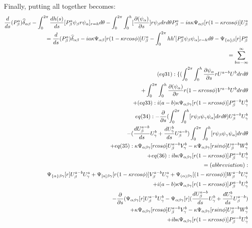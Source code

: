\documentclass{Note}
\begin{document}
Finally,  putting all together becomes:
\begin{equation}
\begin{aligned}
{d \over {d s}} (P_\beta^a )\widehat{\delta }_{\alpha\beta}-\int_0^{2\pi}{dh(s)\over ds}[P_\beta^a \psi_\beta r\psi_\alpha ]_{r=h}d\theta-\int_0^{2\pi} \int_0^h [{\partial (\psi_\alpha) \over {\partial s}}] r  \psi_\beta dr d\theta P_\beta^a-ia\kappa \Psi_{\alpha\beta}[r(1-\kappa rcos\phi)]U_\beta^a\\
={d \over {d s}} (P_\beta^a )\widehat{\delta }_{\alpha\beta}-ia\kappa \Psi_{\alpha\beta}[r(1-\kappa rcos\phi)]U_\beta^a
-\int_0^{2\pi} hh'[P_\beta^a \psi_\beta \psi_\alpha ]_{r=h}d\theta-\Psi_{\{\alpha\}\beta}[r] P_\beta^a\\
=
\sum_{b=-\infty}^{\infty}\\
(eq31):
\{ (\int_0^{2\pi}\int_0^h   {{\partial \psi_\alpha}\over {\partial s}}{r U^{a-b}U^b} dr d\theta \\
+\int_0^{2\pi} \int_0^h { \partial (\psi_\alpha)\over\partial r} r(1-\kappa rcos\phi)V^{a-b}U^b dr d\theta \\
+(eq33): i(a-b)\kappa \Psi_{\alpha\beta\gamma}[r(1-\kappa r cos\phi)]P_\beta^{a-b}U_\gamma^{b}\\
eq(34): 
-{{\partial }\over {\partial s}}(\int_0^{2\pi}\int_0^h   [ {r \psi_\beta} \psi_\gamma \psi_\alpha] dr d\theta)  U_\beta^{a-b}U_\gamma^{b}\\
-({{d U_\beta^{a-b} \over {d s}}U_\gamma^{b}}+{dU_\gamma^{b}\over ds}U_\beta^{a-b})\int_0^{2\pi}\int_0^h   [ {r \psi_\beta} \psi_\gamma \psi_\alpha] dr d\theta\\
+eq(35): 
\kappa \Psi_{\alpha\beta\gamma}[rcos\phi]U_\beta^{a-b}V_\gamma^b-\kappa \Psi_{\alpha\beta\gamma}[r sin\phi]U_\beta^{a-b}W_\gamma^b\\
+eq(36): ib\kappa \Psi_{\alpha\beta\gamma}[r(1-\kappa r cos\phi)]P_\beta^{a-b}U_\gamma^{b}\\
=(abbreviation):\\
 \Psi_{\{\alpha\}\beta\gamma} [r]U_\beta^{a-b}U_\gamma^a
+ \Psi_{[\alpha]\beta\gamma} [r(1-\kappa rcos\phi)]V_\beta^{a-b}U_\gamma^a
+ \Psi_{(\alpha)\beta\gamma} [(1-\kappa rcos\phi)]W_\beta^{a-b}U_\gamma^a\\
+i(a-b)\kappa \Psi_{\alpha\beta\gamma}[r(1-\kappa r cos\phi)]P_\beta^{a-b}U_\gamma^{b}\\
-{{\partial }\over {\partial s}}(\Psi_{\alpha\beta\gamma}[r]U_\beta^{a-b}U_\gamma^{b}
-\Psi_{\alpha\beta\gamma}[r]({{d U_\beta^{a-b} \over {d s}}U_\gamma^{b}}+{dU_\gamma^{b}\over ds}U_\beta^{a-b})\\
+\kappa \Psi_{\alpha\beta\gamma}[rcos\phi]U_\beta^{a-b}V_\gamma^b-\kappa \Psi_{\alpha\beta\gamma}[r sin\phi]U_\beta^{a-b}W_\gamma^b\\
+ ib\kappa \Psi_{\alpha\beta\gamma}[r(1-\kappa r cos\phi)]P_\beta^{a-b}U_\gamma^{b}\\
\end{aligned}
\end{equation}
\end{document}
